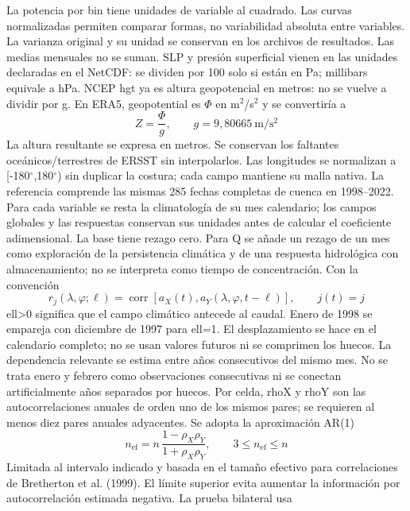 \documentclass[10pt]{article}
\begin{document}
La potencia por bin tiene unidades de variable al cuadrado. Las curvas normalizadas permiten comparar formas, no variabilidad absoluta entre variables. La varianza original y su unidad se conservan en los archivos de resultados.
\newpage
Las medias mensuales no se suman. SLP y presión superficial vienen en las unidades declaradas en el NetCDF: se dividen por 100 solo si están en Pa; millibars equivale a hPa. NCEP hgt ya es altura geopotencial en metros: no se vuelve a dividir por g. En ERA5, geopotential es $\Phi$ en m$^2$/s$^2$ y se convertiría a 
\begin{equation}
Z=\frac{\Phi}{g},\qquad g=9{,}80665\ \mathrm{m/s^2}\tag{5.1}
\end{equation}
La altura resultante se expresa en metros.  Se conservan los faltantes oceánicos/terrestres de ERSST sin interpolarlos. Las longitudes se normalizan a [-180$^\circ$,180$^\circ$) sin duplicar la costura; cada campo mantiene su malla nativa.
\newpage
La referencia comprende las mismas 285 fechas completas de cuenca en 1998--2022. Para cada variable se resta la climatología de su mes calendario; los campos globales y las respuestas conservan sus unidades antes de calcular el coeficiente adimensional. La base tiene rezago cero. Para Q se añade un rezago de un mes como exploración de la persistencia climática y de una respuesta hidrológica con almacenamiento; no se interpreta como tiempo de concentración. Con la convención 
\begin{equation}
r_j(\lambda,\varphi;\ell)=\operatorname{corr}\!\left[a_X(t),a_Y(\lambda,\varphi,t-\ell)\right],\qquad j(t)=j\tag{5.2}
\end{equation}
 ell>0 significa que el campo climático antecede al caudal. Enero de 1998 se empareja con diciembre de 1997 para ell=1. El desplazamiento se hace en el calendario completo; no se usan valores futuros ni se comprimen los huecos.
\newpage
La dependencia relevante se estima entre años consecutivos del mismo mes. No se trata enero y febrero como observaciones consecutivas ni se conectan artificialmente años separados por huecos. Por celda, rhoX y rhoY son las autocorrelaciones anuales de orden uno de los mismos pares; se requieren al menos diez pares anuales adyacentes. Se adopta la aproximación AR(1) 
\begin{equation}
n_{\mathrm{ef}}=n\,\frac{1-\rho_X\rho_Y}{1+\rho_X\rho_Y},\qquad 3\leq n_{\mathrm{ef}}\leq n\tag{5.3}
\end{equation}
Limitada al intervalo indicado y  basada en el tamaño efectivo para correlaciones de Bretherton et al. (1999). El límite superior evita aumentar la información por autocorrelación estimada negativa. La prueba bilateral usa 
\end{document}
